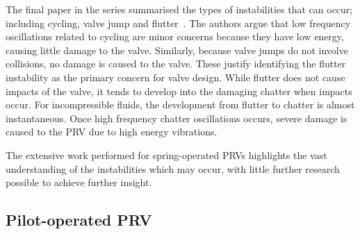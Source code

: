 The final paper in the series summarised the types of instabilities that can occur; including cycling, valve jump and flutter~\cite{Hos2017DynamicRecommendations}.
The authors argue that low frequency oscillations related to cycling are minor concerns because they have low energy, causing little damage to the valve. Similarly, because valve jumps do not involve collisions, no damage is caused to the valve.
%
These justify identifying the flutter instability as the primary concern for valve design. While flutter does not cause impacts of the valve, it tends to develop into the damaging chatter when impacts occur. For incompressible fluids, the development from flutter to chatter is almost instantaneous. Once high frequency chatter oscillations occurs, severe damage is caused to the PRV due to high energy vibrations. %

The extensive work performed for spring-operated PRVs highlights the vast understanding of the  instabilities which may occur, with little further research possible to achieve further insight.

\subsection{Pilot-operated PRV}


